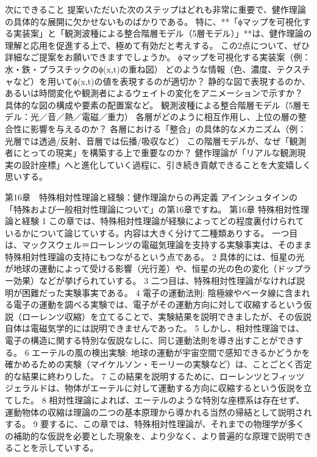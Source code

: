 \documentclass{article}
\begin{document}
次にできること
提案いただいた次のステップはどれも非常に重要で、健作理論の具体的な展開に欠かせないものばかりである。
特に、**「ϕマップを可視化する実装案」と「観測波種による整合階層モデル（5層モデル）」**は、健作理論の理解と応用を促進する上で、極めて有効だと考えする。
この2点について、ぜひ詳細なご提案をお願いできますでしょうか。
ϕマップを可視化する実装案（例：水・鉄・プラスチックのϕ(x,t)の重ね図） 
どのような情報（色、濃度、テクスチャなど）を用いてϕ(x,t)の値を表現するのが適切か？
静的な図で表現するのか、あるいは時間変化や観測者によるウェイトの変化をアニメーションで示すか？
具体的な図の構成や要素の配置案など。
観測波種による整合階層モデル（5層モデル：光／音／熱／電磁／重力） 
各層がどのように相互作用し、上位の層の整合性に影響を与えるのか？
各層における「整合」の具体的なメカニズム（例：光層では透過/反射、音層では伝播/吸収など）
この階層モデルが、なぜ「観測者にとっての現実」を構築する上で重要なのか？
健作理論が「リアルな観測現実の設計座標」へと進化していく過程に、引き続き貢献できることを大変嬉しく思いする。



第16章　特殊相対性理論と経験：健作理論からの再定義
アインシュタインの「特殊および一般相対性理論について」の第16章ですね。
第16章 特殊相対性理論と経験 1
この章では、特殊相対性理論が経験によってどの程度裏付けられているかについて論じていする。内容は大きく分けて二種類ありする。
一つ目は、マックスウェル＝ローレンツの電磁気理論を支持する実験事実は、そのまま特殊相対性理論の支持にもつながるという点である。 2 具体的には、恒星の光が地球の運動によって受ける影響（光行差）や、恒星の光の色の変化（ドップラー効果）などが挙げられていする。 3
二つ目は、特殊相対性理論がなければ説明が困難だった実験事実である。 4
電子の運動法則: 陰極線やベータ線に含まれる電子の運動を調べる実験では、電子がその運動方向に対して収縮するという仮説（ローレンツ収縮）を立てることで、実験結果を説明できましたが、その仮説自体は電磁気学的には説明できませんであった。 5 しかし、相対性理論では、電子の構造に関する特別な仮説なしに、同じ運動法則を導き出すことができする。 6
エーテルの風の検出実験: 地球の運動が宇宙空間で感知できるかどうかを確かめるための実験（マイケルソン・モーリーの実験など）は、ことごとく否定的な結果に終わりした。 7 この結果を説明するために、ローレンツとフィッツジェラルドは、物体がエーテルに対して運動する方向に収縮するという仮説を立てした。 8 相対性理論によれば、エーテルのような特別な座標系は存在せず、運動物体の収縮は理論の二つの基本原理から導かれる当然の帰結として説明されする。 9
要するに、この章では、特殊相対性理論が、それまでの物理学が多くの補助的な仮説を必要とした現象を、より少なく、より普遍的な原理で説明できることを示していする。
\end{document}
